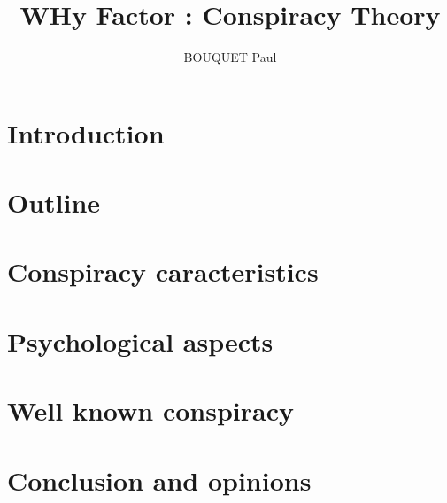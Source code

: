 \documentclass[a4paper,12pt]{article}
\begin{document}
\author{BOUQUET Paul}
\title{WHy Factor : Conspiracy Theory}
\date{}

\maketitle

\section{Introduction}

\section{Outline}

\section{Conspiracy caracteristics}

\section{Psychological aspects}

\section{Well known conspiracy}

\section{Conclusion and opinions}
\end{document}
